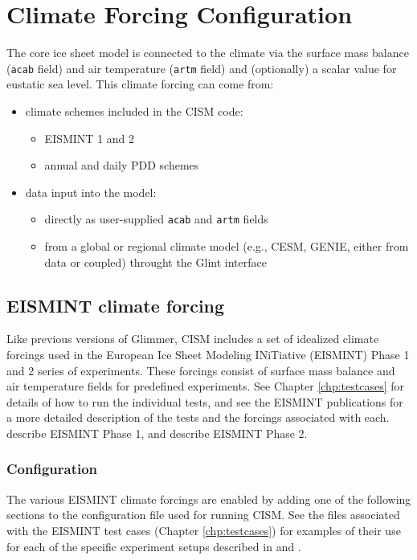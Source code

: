 \section{Climate Forcing Configuration}
The core ice sheet model is connected to the climate via the surface mass balance (\texttt{acab} field) 
and air temperature (\texttt{artm} field) and (optionally) a scalar value for eustatic sea level. 
This climate forcing can come from:
\begin{itemize}
  \item  climate schemes included in the CISM code:
    \begin{itemize}
      \item EISMINT 1 and 2
      \item annual and daily PDD schemes
    \end{itemize}

  \item  data input into the model:
    \begin{itemize}
      \item directly as user-supplied \texttt{acab} and \texttt{artm} fields
      \item from a global or regional climate model (e.g., CESM, GENIE, either from data or coupled) throught the Glint interface
    \end{itemize}
\end{itemize}



%
\subsection{EISMINT climate forcing}\label{driver:eismint}
Like previous versions of Glimmer, CISM includes a set of idealized climate forcings used in the 
European Ice Sheet Modeling INiTiative (EISMINT) Phase 1 and 2
series of experiments.  These forcings consist of surface mass balance and 
air temperature fields for predefined experiments.  See Chapter \ref{chp:testcases}
for details of how to run the individual tests, and see the EISMINT publications
for a more detailed description of the tests and the forcings associated with each.
\citet{Huybrechts1996} describe EISMINT Phase 1, and \citet{Payne2000} describe EISMINT Phase 2.

\subsubsection{Configuration}
The various EISMINT climate forcings are enabled by adding one of the following
sections to the configuration file used for running CISM.  See the files associated
with the EISMINT test cases (Chapter \ref{chp:testcases}) for examples of their use
for each of the specific experiment setups described in \citet{Huybrechts1996} and \citet{Payne2000}.

